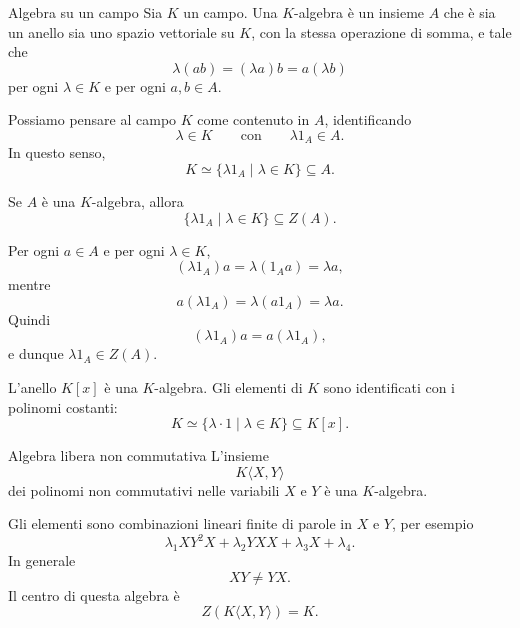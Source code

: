 \documentclass[a4paper]{article}
\begin{document}
\begin{radioactive}
\begin{snippetdefinition}{Algebra su un campo}
    Sia \(K\) un campo. Una \(K\)-algebra è un insieme \(A\) che è sia un anello sia uno spazio vettoriale su \(K\), con la stessa operazione di somma, e tale che
    \[
        \lambda(ab)=(\lambda a)b=a(\lambda b)
    \]
    per ogni \(\lambda\in K\) e per ogni \(a,b\in A\).
\end{snippetdefinition}
\end{radioactive}

\begin{radioactive}
Possiamo pensare al campo \(K\) come contenuto in \(A\), identificando
\[
    \lambda\in K
    \qquad
    \text{con}
    \qquad
    \lambda 1_A\in A.
\]
In questo senso,
\[
    K\simeq \{\lambda 1_A \mid \lambda\in K\}\subseteq A.
\]
\end{radioactive}

\begin{radioactive}
\begin{snippetproposition}{}
    Se \(A\) è una \(K\)-algebra, allora
    \[
        \{\lambda 1_A \mid \lambda\in K\}\subseteq Z(A).
    \]
\end{snippetproposition}
\end{radioactive}

\begin{radioactive}
\begin{snippetproof}{}
    Per ogni \(a\in A\) e per ogni \(\lambda\in K\),
    \[
        (\lambda 1_A)a
        =
        \lambda(1_Aa)
        =
        \lambda a,
    \]
    mentre
    \[
        a(\lambda 1_A)
        =
        \lambda(a1_A)
        =
        \lambda a.
    \]
    Quindi
    \[
        (\lambda 1_A)a=a(\lambda 1_A),
    \]
    e dunque \(\lambda 1_A\in Z(A)\).
\end{snippetproof}
\end{radioactive}

\begin{radioactive}
\begin{snippetexample}{}
    L'anello \(K[x]\) è una \(K\)-algebra. Gli elementi di \(K\) sono identificati con i polinomi costanti:
    \[
        K\simeq \{\lambda\cdot 1 \mid \lambda\in K\}\subseteq K[x].
    \]
\end{snippetexample}
\end{radioactive}

\begin{radioactive}
\begin{snippetexample}{Algebra libera non commutativa}
    L'insieme
    \[
        K\langle X,Y\rangle
    \]
    dei polinomi non commutativi nelle variabili \(X\) e \(Y\) è una \(K\)-algebra.

    Gli elementi sono combinazioni lineari finite di parole in \(X\) e \(Y\), per esempio
    \[
        \lambda_1XY^2X+\lambda_2YXX+\lambda_3X+\lambda_4.
    \]
    In generale
    \[
        XY\neq YX.
    \]
    Il centro di questa algebra è
    \[
        Z(K\langle X,Y\rangle)=K.
    \]
\end{snippetexample}
\end{radioactive}
\end{document}
